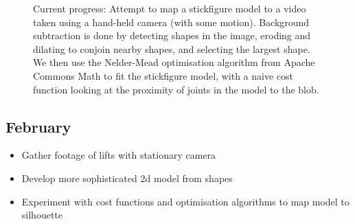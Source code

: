 \begin{figure}[H]
    \centering
\caption{Current progress: Attempt to map a stickfigure model to a video taken using a hand-held camera (with some motion). Background subtraction is done by detecting shapes in the image, eroding and dilating to conjoin nearby shapes, and selecting the largest shape. We then use the Nelder-Mead optimisation algorithm from Apache Commons Math to fit the stickfigure model, with a naive cost function looking at the proximity of joints in the model to the blob.}
\label{fig:currentprogress}
\end{figure}


\subsection{February}

\begin{itemize}
	\item Gather footage of lifts with stationary camera
	\item Develop more sophisticated 2d model from shapes
	\item Experiment with cost functions and optimisation algorithms to map model to silhouette
\end{itemize}

